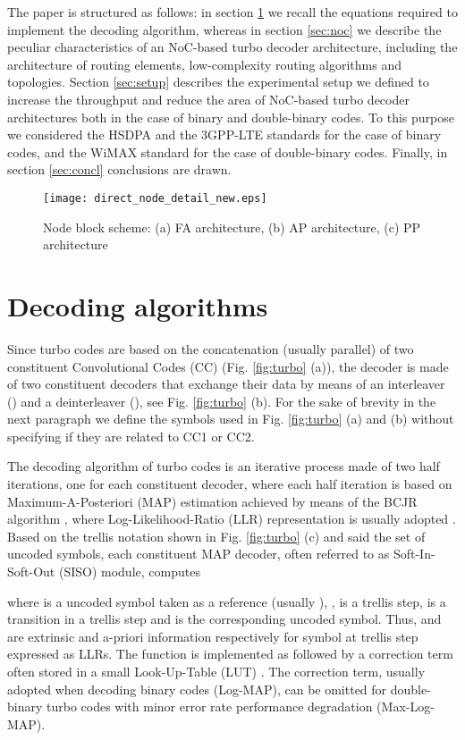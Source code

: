 \documentclass[10pt,twocolumn,journal]{IEEEtran}
\begin{document}
The paper is structured as follows: in section \ref{sec:theory} we recall the equations required to implement the 
decoding algorithm, whereas in section \ref{sec:noc} we describe the peculiar characteristics of an NoC-based turbo 
decoder architecture, including the architecture of routing elements, low-complexity routing algorithms and topologies.
Section \ref{sec:setup} describes the experimental setup we defined to increase the throughput and reduce the area 
of NoC-based turbo decoder architectures both in the case of binary and double-binary codes. To this purpose 
we considered the HSDPA and the 3GPP-LTE standards for the case of binary codes, and the WiMAX standard for the 
case of double-binary codes. Finally, in section \ref{sec:concl} conclusions are drawn.
\begin{figure*}[t!]
  \centering
  \texttt{[image: direct\_node\_detail\_new.eps]}
\caption{Node block scheme: 
(a) FA architecture, 
(b) AP architecture, 
(c) PP architecture}
\label{fig:nodes}
\end{figure*}

\section{Decoding algorithms}
\label{sec:theory}

Since turbo codes are based on the concatenation (usually parallel) 
of two constituent Convolutional Codes (CC) (Fig. \ref{fig:turbo} (a)), the decoder is made of 
two constituent decoders that exchange their data by means of an interleaver () and a deinterleaver (), 
see Fig. \ref{fig:turbo} (b). For the sake of brevity in the next paragraph 
we define the symbols used in Fig. \ref{fig:turbo} (a) and (b) 
without specifying if they are related to CC1 or CC2.

The decoding algorithm of turbo codes is an iterative process made of two half iterations, one for each constituent 
decoder, where each half iteration is based on Maximum-A-Posteriori (MAP) estimation 
achieved by means of the BCJR algorithm \cite{bahl_TrIT94}, where Log-Likelihood-Ratio (LLR) representation is 
usually adopted \cite{robertson_ICC95}. 
Based on the trellis notation shown in Fig. \ref{fig:turbo} (c) and said  the set of uncoded symbols, 
each constituent MAP decoder, often referred to as Soft-In-Soft-Out (SISO) module, computes 

where  is a uncoded symbol taken as a reference (usually ), 
, 
 is a trellis step,  is a transition in a trellis step and  is the corresponding uncoded symbol. 
Thus,  and  are extrinsic and a-priori information respectively 
for symbol  at trellis step  expressed as LLRs.
The  function is implemented as 
 followed by a correction term often stored in a small Look-Up-Table (LUT) 
\cite{robertson_ETT97, martina_CL09}. 
The correction term, usually adopted when decoding binary
codes (Log-MAP), can be omitted for double-binary turbo codes with minor error rate performance degradation (Max-Log-MAP). 
\end{document}
